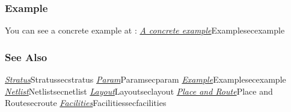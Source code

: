 \subsubsection{Example}

You can see a concrete example at : \hyperref[ref]{\emph{A concrete example}}{}{Example}{secexample}
   
\subsubsection{See Also}

\hyperref[ref]{\emph{Stratus}}{}{Stratus}{secstratus}
\hyperref[ref]{\emph{Param}}{}{Param}{secparam}
\hyperref[ref]{\emph{Example}}{}{Example}{secexample}
\hyperref[ref]{\emph{Netlist}}{}{Netlist}{secnetlist}
\hyperref[ref]{\emph{Layout}}{}{Layout}{seclayout}
\hyperref[ref]{\emph{Place and Route}}{}{Place and Route}{secroute}
\hyperref[ref]{\emph{Facilities}}{}{Facilities}{secfacilities}

